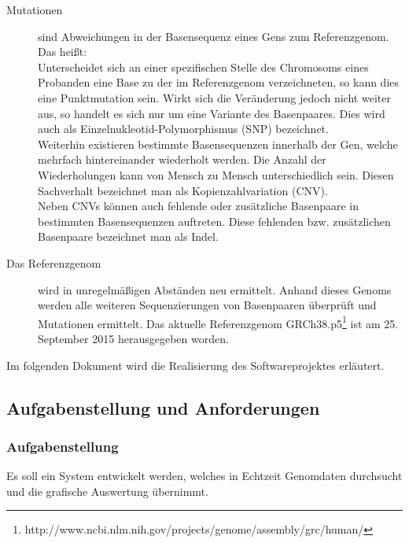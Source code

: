 \begin{description}
\item[Mutationen] sind Abweichungen in der Basensequenz eines Gens zum Referenzgenom. Das heißt:\\Unterscheidet sich an einer spezifischen Stelle des Chromosoms eines Probanden eine Base zu der im Referenzgenom verzeichneten, so kann dies eine Punktmutation sein. Wirkt sich die Veränderung jedoch nicht weiter aus, so handelt es sich nur um eine Variante des Basenpaares. Dies wird auch als Einzelnukleotid-Polymorphismus (SNP) bezeichnet.\\
Weiterhin existieren bestimmte Basensequenzen innerhalb der Gen, welche mehrfach hintereinander wiederholt werden. Die Anzahl der Wiederholungen kann von Mensch zu Mensch unterschiedlich sein. Diesen Sachverhalt bezeichnet man als Kopienzahlvariation (CNV).\\
Neben CNVs können auch fehlende oder zusätzliche Basenpaare in bestimmten Basensequenzen auftreten. Diese fehlenden bzw. zusätzlichen Basenpaare bezeichnet man als Indel.\\


\item[Das Referenzgenom] wird in unregelmäßigen Abständen neu ermittelt. Anhand dieses Genoms werden alle weiteren Sequenzierungen von Basenpaaren überprüft und Mutationen ermittelt. Das aktuelle Referenzgenom GRCh38.p5\footnote{\label{foot:0}http://www.ncbi.nlm.nih.gov/projects/genome/assembly/grc/human/} ist am 25. September 2015 herausgegeben worden.
\end{description}
Im folgenden Dokument wird die Realisierung des Softwareprojektes erläutert.
\newpage


\subsection{Aufgabenstellung und Anforderungen}
\subsubsection{Aufgabenstellung}
Es soll ein System entwickelt werden, welches in Echtzeit Genomdaten durchsucht und die grafische Auswertung übernimmt. 
